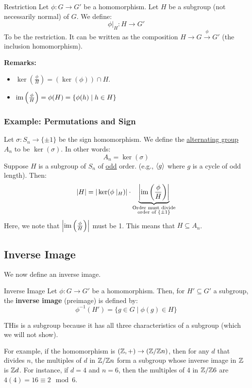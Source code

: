 \documentclass[letterpaper]{article}
\begin{document}
\begin{definition}{Restriction}{}
    Let $\phi: G \to G'$ be a homomorphism. Let $H$ be a subgroup (not necessarily normal) of $G$. We define: 
    \[\phi |_{H}: H \to G'\]
    To be the restriction. It can be written as the composition $H \to G \xrightarrow{\phi} G'$ (the inclusion homomorphism). 
\end{definition}
\textbf{Remarks:}
\begin{itemize}
    \item $\ker\left(\frac{\phi}{H}\right) = (\ker(\phi)) \cap H$.
    \item $\operatorname{im}\left(\frac{\phi}{H}\right) = \phi(H) = \{\phi(h) \mid h \in H\}$
\end{itemize}

\subsubsection{Example: Permutations and Sign}
Let $\sigma: S_n \to \{\pm 1\}$ be the sign homomorphism. We define the \underline{alternating group} $A_n$ to be $\ker(\sigma)$. In other words:
\[A_n = \ker(\sigma)\]
Suppose $H$ is a subgroup of $S_n$ of \underline{odd} order. (e.g., $\langle g \rangle$ where $g$ is a cycle of odd length). Then: 
\[|H| = |\ker(\phi \mid_H)| \cdot \underbrace{\left|\operatorname{im}\left(\frac{\phi}{H}\right)\right|}_{\substack{\text{Order must divide} \\ \text{order of } \{\pm 1\}}}\]
Here, we note that $\left|\operatorname{im}\left(\frac{\phi}{H}\right)\right|$ must be 1. This means that $H \subseteq A_n$. 

\subsection{Inverse Image}
We now define an inverse image.
\begin{definition}{Inverse Image}{}
    Let $\phi: G \to G'$ be a homomorphism. Then, for $H' \subseteq G'$ a subgroup, the \textbf{inverse image} (preimage) is defined by: 
\[\phi^{-1}(H') = \{g \in G \mid \phi(g) \in H\}\]
\end{definition}
THis is a subgroup because it has all three characteristics of a subgroup (which we will not show). 

\bigskip

For example, if the homomorphism is $(\mathbb{Z}, +) \to (\mathbb{Z} / \mathbb{Z} n)$, then for any $d$ that divides $n$, the multiples of $d$ in $\mathbb{Z} / \mathbb{Z} n$ form a subgroup whose inverse image in $\mathbb{Z}$ is $\mathbb{Z} d$. For instance, if $d = 4$ and $n = 6$, then the multiples of 4 in $\mathbb{Z} / \mathbb{Z} 6$ are $4(4) = 16 \equiv 2 \mod{6}$. 
\end{document}
